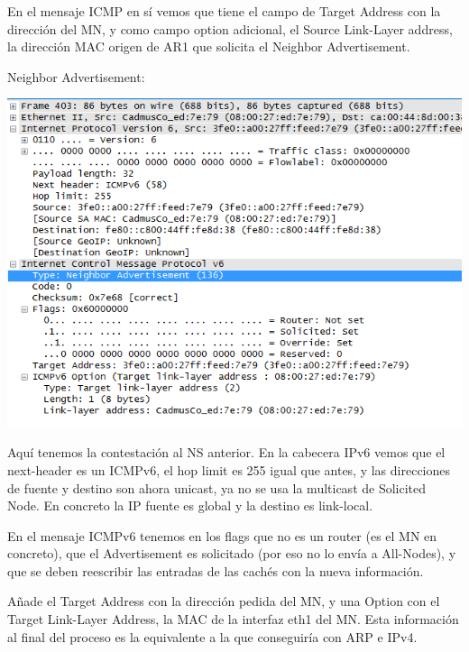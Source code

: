 \documentclass{article}
\begin{document}
En el mensaje ICMP en sí vemos que tiene el campo de Target Address con la dirección del MN, y como campo option adicional, el Source Link-Layer address, la dirección MAC origen de AR1 que solicita el Neighbor Advertisement.


\hfill

\hfill

Neighbor Advertisement:

\begin{center}
	\includegraphics[scale=0.8]{images/neighAdv.PNG}
\end{center}

Aquí tenemos la contestación al NS anterior. En la cabecera IPv6 vemos que el next-header es un ICMPv6, el hop limit es 255 igual que antes, y las direcciones de fuente y destino son ahora unicast, ya no se usa la multicast de Solicited Node. En concreto la IP fuente es global y la destino es link-local.

En el mensaje ICMPv6 tenemos en los flags que no es un router (es el MN en concreto), que el Advertisement es solicitado (por eso no lo envía a All-Nodes), y que se deben reescribir las entradas de las cachés con la nueva información.

Añade el Target Address con la dirección pedida del MN, y una Option con el Target Link-Layer Address, la MAC de la interfaz eth1 del MN. Esta información al final del proceso es la equivalente a la que conseguiría con ARP e IPv4.


\appendix
\end{document}
